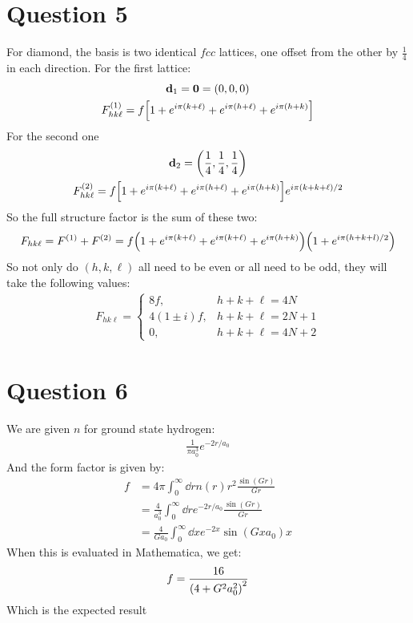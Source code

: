 \documentclass[12pt]{article}
\begin{document}
\section*{Question 5}
For diamond, the basis is two identical $fcc$ lattices, one offset from the other by $\frac{1}{4}$ in each direction. For the first lattice:
\begin{gather*}
  \vb{d}_1=\vb{0}=(0,0,0)\\
  F^{(1)}_{hk\ell}=f\qty[1+e^{i\pi(k+\ell)}+e^{i\pi(h+\ell)}+e^{i\pi(h+k)}]
\end{gather*}
For the second one
\begin{gather*}
  \vb{d}_2=\qty(\frac{1}{4},\frac{1}{4},\frac{1}{4})\\
  F^{(2)}_{hk\ell}=f\qty[1+e^{i\pi(k+\ell)}+e^{i\pi(h+\ell)}+e^{i\pi(h+k)}]
  e^{i\pi(k+k+\ell)/2}
\end{gather*}
So the full structure factor is the sum of these two:
\begin{align*}
  F_{hk\ell}=F^{(1)}+F^{(2)}=f\qty(1+e^{i\pi(k+\ell)}+e^{i\pi(k+\ell)}+e^{i\pi(h+k)})
  \qty(1+e^{i\pi(h+k+l)/2})
\end{align*}
So not only do $(h,k,\ell)$ all need to be even or all need to be odd, they will take the following values:
\begin{align*}
  F_{hk\ell}=
  \begin{cases}
    8f, & h+k+\ell=4N\\
    4(1\pm i)f, & h+k+\ell=2N+1\\
    0, & h+k+\ell=4N+2
  \end{cases}
\end{align*}
\section*{Question 6}
We are given $n$ for ground state hydrogen:
\begin{align*}
  \frac{1}{\pi a_0^3}e^{-2r/a_0}
\end{align*}
And the form factor is given by:
\begin{align*}
  f&=4\pi\int_0^\infty\dd{r} n(r)r^2\frac{\sin(Gr)}{Gr}\\
  &=\frac{4}{a_0^3}\int_0^\infty\dd{r}e^{-2r/a_0}\frac{\sin(Gr)}{Gr}\\
  &=\frac{4}{Ga_0}\int_0^\infty\dd{x}e^{-2x}\sin(Gxa_0)x
\end{align*}
When this is evaluated in Mathematica, we get:
\begin{align*}
  f=\frac{16}{\qty(4+G^2a_0^2)^2}
\end{align*}
Which is the expected result
\end{document}
